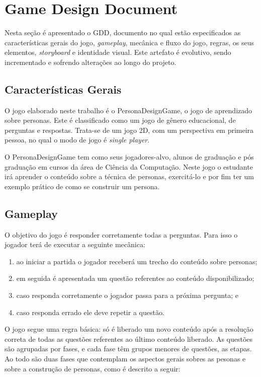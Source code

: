 \section{Game Design Document}
\label{sec:gdd}
Nesta seção é apresentado o GDD, documento no qual estão especificados as características gerais do jogo, \textit{gameplay}, mecânica e fluxo do jogo, regras, os seus elementos, \textit{storyboard} e identidade visual. Este artefato é evolutivo, sendo incrementado e sofrendo alterações ao longo do projeto.

\subsection{Características Gerais}
O jogo elaborado neste trabalho é o PersonaDesignGame, o jogo de aprendizado sobre personas. Este é classificado como um jogo de gênero educacional, de perguntas e respostas. Trata-se de um jogo 2D, com um perspectiva em primeira pessoa, no qual o modo de jogo é \textit{single player}.

O PersonaDesignGame  tem como seus jogadores-alvo, alunos de graduação e pós graduação em cursos da área de Ciência da Computação. Neste jogo o estudante irá aprender o conteúdo sobre a técnica de personas, exercitá-lo e por fim ter um exemplo prático de como se construir um persona.

\subsection{Gameplay}

O objetivo do jogo é responder corretamente todas a perguntas. Para isso o jogador terá de executar a seguinte mecânica:

\begin{enumerate}
    \item ao iniciar a partida o jogador receberá um trecho do conteúdo sobre personas;
    \item em seguida é apresentada um questão referentes ao conteúdo disponibilizado;
    \item caso responda corretamente o jogador passa para a próxima pergunta; e
    \item caso responda errado ele deve repetir a questão.
\end{enumerate}

O jogo segue uma regra básica: só é liberado um novo conteúdo após a resolução correta de todas as questões referentes ao último conteúdo liberado. As questões são agrupadas por fases, e cada fase têm grupos menores de questões, as etapas. Ao todo são duas fases que contemplam os aspectos gerais sobres as pesonas e sobre a construção de personas, como é descrito a seguir:

